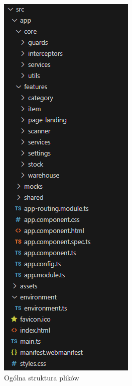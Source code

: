 \documentclass[../../main.tex]{subfiles}
\begin{document}
    \begin{figure}[ht!]
        \begin{subfigure}{.5\textwidth}
            \centering
            \includegraphics[height=0.4\pdfpageheight]{images/front-repo-structure.png}
            \caption{Ogólna struktura plików}
            \label{fig:front-repo-structure-general}
        \end{subfigure}
        \begin{subfigure}{.5\textwidth}
            \centering

\end{subfigure}
\end{figure}
\end{document}
